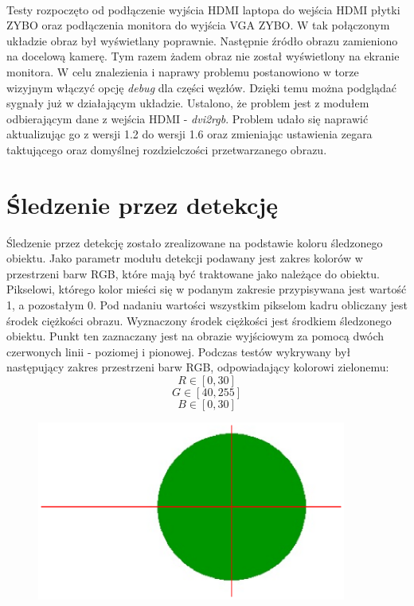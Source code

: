 \paragraph*{}
Testy rozpoczęto od podłączenie wyjścia HDMI laptopa do wejścia HDMI płytki ZYBO oraz podłączenia monitora do wyjścia VGA ZYBO. W tak połączonym układzie obraz był wyświetlany poprawnie. Następnie źródło obrazu zamieniono na docelową kamerę. Tym razem żadem obraz nie został wyświetlony na ekranie monitora. W celu znalezienia i naprawy problemu postanowiono w torze wizyjnym włączyć opcję \textit{debug} dla części węzłów. Dzięki temu można podglądać sygnały już w działającym układzie. Ustalono, że problem jest z modułem odbierającym dane z wejścia HDMI - \textit{dvi2rgb}. Problem udało się naprawić aktualizując go z wersji 1.2 do wersji 1.6 oraz zmieniając ustawienia zegara taktującego oraz domyślnej rozdzielczości przetwarzanego obrazu.

\section{Śledzenie przez detekcję}
\label{sec:sledzenieprzezdetekcje}

Śledzenie przez detekcję zostało zrealizowane na podstawie koloru śledzonego obiektu. Jako parametr modułu detekcji podawany jest zakres kolorów w przestrzeni barw RGB, które mają być traktowane jako należące do obiektu. Pikselowi, którego kolor mieści się w podanym zakresie przypisywana jest wartość 1, a pozostałym 0. Pod nadaniu wartości wszystkim pikselom kadru obliczany jest środek ciężkości obrazu. Wyznaczony środek ciężkości jest środkiem śledzonego obiektu. Punkt ten zaznaczany jest na obrazie wyjściowym za pomocą dwóch czerwonych linii - poziomej i pionowej. Podczas testów wykrywany był następujący zakres przestrzeni barw RGB, odpowiadający kolorowi zielonemu:
\begin{equation}
R \in [0,30]
\end{equation}
\begin{equation}
G \in [40,255]
\end{equation}
\begin{equation}
B \in [0,30]
\end{equation}

\begin{figure}[h]
	\centering
	\includegraphics[width=4in]{kolo_srodek.eps}
\end{figure}

